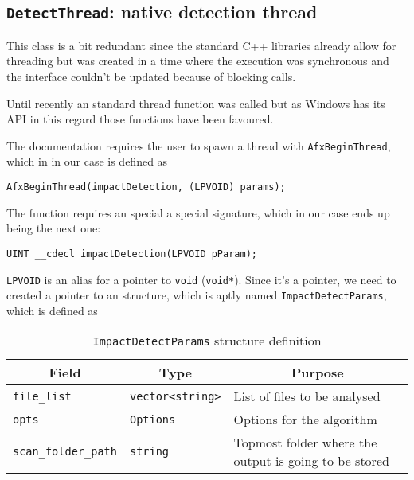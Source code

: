 \documentclass[a4paper,11pt]{memoir}
\begin{document}
\subsection{\texttt{DetectThread}: native detection thread}

This class is a bit redundant since the standard C++ libraries already allow for threading but was created in a time where the execution was synchronous and the interface couldn’t be updated because of blocking calls. 

Until recently an standard thread function was called but as Windows has its API in this regard those functions have been favoured.

The documentation requires the user to spawn a thread with \texttt{AfxBeginThread}, which in in our case is defined as

\begin{center}
\begin{verbatim}
AfxBeginThread(impactDetection, (LPVOID) params);
\end{verbatim}
\end{center}

The function requires an special a special signature, which in our case ends up being the next one:

\begin{center}
\begin{verbatim}
UINT __cdecl impactDetection(LPVOID pParam);
\end{verbatim}
\end{center}

\texttt{LPVOID} is an alias for a pointer to \texttt{void} (\texttt{void*}). Since it’s a pointer, we need to created a pointer to an structure, which is aptly named \texttt{ImpactDetectParams}, which is defined as

\begin{table}[H]
\centering
\caption{\texttt{ImpactDetectParams} structure definition}
\label{my-label}
\begin{tabular}{|m{}|m{}|m{}|}
\hline
\multicolumn{1}{|c|}{\textbf{Field}} & \multicolumn{1}{c|}{\textbf{Type}} & \multicolumn{1}{c|}{\textbf{Purpose}} \\ \hline 
\texttt{file\_list} & \texttt{vector<string>} & List of files to be analysed \\ \hline
\texttt{opts} &\texttt{Options} & Options for the algorithm \\ \hline
\texttt{scan\_folder\_path} & \texttt{string} & Topmost folder where the output is going to be stored  \\ \hline
\end{tabular}
\end{table}
\end{document}
